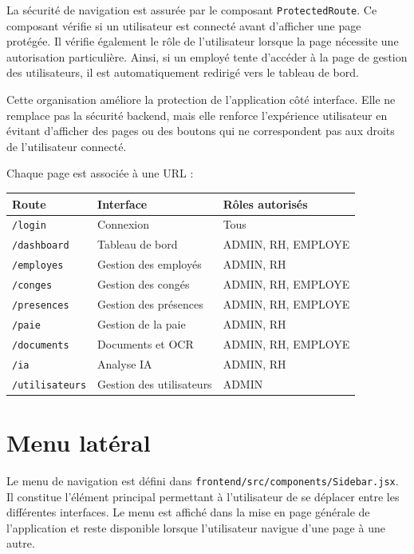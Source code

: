 \documentclass[12pt,a4paper]{report}
\begin{document}
La sécurité de navigation est assurée par le composant \texttt{ProtectedRoute}. Ce composant vérifie si un utilisateur est connecté avant d'afficher une page protégée. Il vérifie également le rôle de l'utilisateur lorsque la page nécessite une autorisation particulière. Ainsi, si un employé tente d'accéder à la page de gestion des utilisateurs, il est automatiquement redirigé vers le tableau de bord.

Cette organisation améliore la protection de l'application côté interface. Elle ne remplace pas la sécurité backend, mais elle renforce l'expérience utilisateur en évitant d'afficher des pages ou des boutons qui ne correspondent pas aux droits de l'utilisateur connecté.

Chaque page est associée à une URL :

\begin{longtable}{|p{4cm}|p{5cm}|p{5cm}|}
\hline
\textbf{Route} & \textbf{Interface} & \textbf{Rôles autorisés} \\
\hline
\texttt{/login} & Connexion & Tous \\
\hline
\texttt{/dashboard} & Tableau de bord & ADMIN, RH, EMPLOYE \\
\hline
\texttt{/employes} & Gestion des employés & ADMIN, RH \\
\hline
\texttt{/conges} & Gestion des congés & ADMIN, RH, EMPLOYE \\
\hline
\texttt{/presences} & Gestion des présences & ADMIN, RH, EMPLOYE \\
\hline
\texttt{/paie} & Gestion de la paie & ADMIN, RH \\
\hline
\texttt{/documents} & Documents et OCR & ADMIN, RH, EMPLOYE \\
\hline
\texttt{/ia} & Analyse IA & ADMIN, RH \\
\hline
\texttt{/utilisateurs} & Gestion des utilisateurs & ADMIN \\
\hline
\end{longtable}

\section{Menu latéral}

Le menu de navigation est défini dans \texttt{frontend/src/components/Sidebar.jsx}. Il constitue l'élément principal permettant à l'utilisateur de se déplacer entre les différentes interfaces. Le menu est affiché dans la mise en page générale de l'application et reste disponible lorsque l'utilisateur navigue d'une page à une autre.
\end{document}
